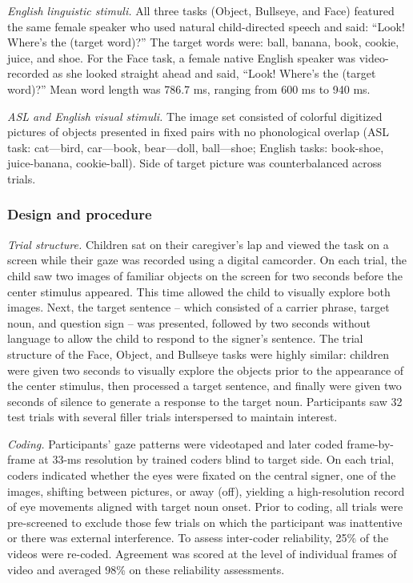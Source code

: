 \documentclass[oneside]{report}
\begin{document}
\emph{English linguistic stimuli.} All three tasks (Object, Bullseye,
and Face) featured the same female speaker who used natural
child-directed speech and said: ``Look! Where's the (target word)?'' The
target words were: ball, banana, book, cookie, juice, and shoe. For the
Face task, a female native English speaker was video-recorded as she
looked straight ahead and said, ``Look! Where's the (target word)?''
Mean word length was 786.7 ms, ranging from 600 ms to 940 ms.

\emph{ASL and English visual stimuli.} The image set consisted of
colorful digitized pictures of objects presented in fixed pairs with no
phonological overlap (ASL task: cat---bird, car---book, bear---doll,
ball---shoe; English tasks: book-shoe, juice-banana, cookie-ball). Side
of target picture was counterbalanced across trials.

\subsubsection{Design and procedure}\label{design-and-procedure}

\emph{Trial structure.} Children sat on their caregiver's lap and viewed
the task on a screen while their gaze was recorded using a digital
camcorder. On each trial, the child saw two images of familiar objects
on the screen for two seconds before the center stimulus appeared. This
time allowed the child to visually explore both images. Next, the target
sentence -- which consisted of a carrier phrase, target noun, and
question sign -- was presented, followed by two seconds without language
to allow the child to respond to the signer's sentence. The trial
structure of the Face, Object, and Bullseye tasks were highly similar:
children were given two seconds to visually explore the objects prior to
the appearance of the center stimulus, then processed a target sentence,
and finally were given two seconds of silence to generate a response to
the target noun. Participants saw 32 test trials with several filler
trials interspersed to maintain interest.

\emph{Coding.} Participants' gaze patterns were videotaped and later
coded frame-by-frame at 33-ms resolution by trained coders blind to
target side. On each trial, coders indicated whether the eyes were
fixated on the central signer, one of the images, shifting between
pictures, or away (off), yielding a high-resolution record of eye
movements aligned with target noun onset. Prior to coding, all trials
were pre-screened to exclude those few trials on which the participant
was inattentive or there was external interference. To assess
inter-coder reliability, 25\% of the videos were re-coded. Agreement was
scored at the level of individual frames of video and averaged 98\% on
these reliability assessments.
\end{document}
